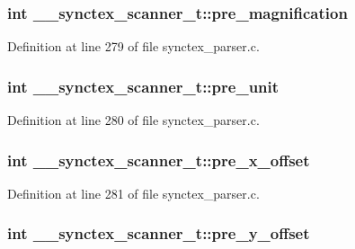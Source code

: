 \hypertarget{struct____synctex__scanner__t_ab830f0b6d8d83da0eb582b353fa0eed1}{
\subsubsection[{pre\+\_\+magnification}]{\setlength{\rightskip}{0pt plus 5cm}int \+\_\+\+\_\+synctex\+\_\+scanner\+\_\+t\+::pre\+\_\+magnification}}\label{struct____synctex__scanner__t_ab830f0b6d8d83da0eb582b353fa0eed1}


Definition at line 279 of file synctex\+\_\+parser.\+c.

\hypertarget{struct____synctex__scanner__t_a3c003c5af5fae997e7a7f6f6cf302232}{
\subsubsection[{pre\+\_\+unit}]{\setlength{\rightskip}{0pt plus 5cm}int \+\_\+\+\_\+synctex\+\_\+scanner\+\_\+t\+::pre\+\_\+unit}}\label{struct____synctex__scanner__t_a3c003c5af5fae997e7a7f6f6cf302232}


Definition at line 280 of file synctex\+\_\+parser.\+c.

\hypertarget{struct____synctex__scanner__t_a7e40da777ed2d810359b72361a29193a}{
\subsubsection[{pre\+\_\+x\+\_\+offset}]{\setlength{\rightskip}{0pt plus 5cm}int \+\_\+\+\_\+synctex\+\_\+scanner\+\_\+t\+::pre\+\_\+x\+\_\+offset}}\label{struct____synctex__scanner__t_a7e40da777ed2d810359b72361a29193a}


Definition at line 281 of file synctex\+\_\+parser.\+c.

\hypertarget{struct____synctex__scanner__t_a74d67e2408f0e5dc2cd71be04651b204}{
\subsubsection[{pre\+\_\+y\+\_\+offset}]{\setlength{\rightskip}{0pt plus 5cm}int \+\_\+\+\_\+synctex\+\_\+scanner\+\_\+t\+::pre\+\_\+y\+\_\+offset}}\label{struct____synctex__scanner__t_a74d67e2408f0e5dc2cd71be04651b204}


